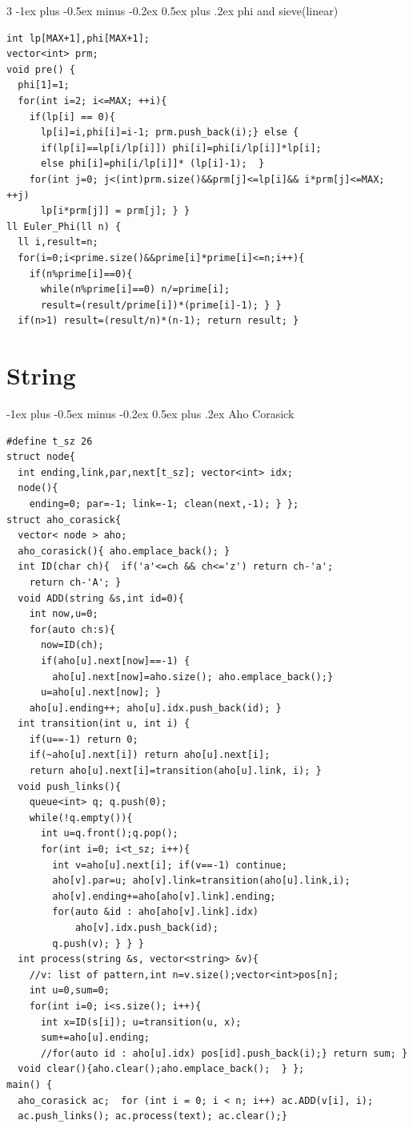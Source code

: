 \documentclass[8pt,a4paper,onesided]{article}
\makeatletter
\renewcommand{\subsection}{\@startsection{subsection}{2}{0mm}
    {-1ex plus -0.5ex minus -0.2ex} %
    {0.5ex plus .2ex}                %
    {\normalfont\large\bfseries}}    %
\makeatother
\begin{document}
\begin{multicols}{3}
\subsection{phi and sieve(linear)}
\begin{verbatim}
int lp[MAX+1],phi[MAX+1];
vector<int> prm;
void pre() {
  phi[1]=1;
  for(int i=2; i<=MAX; ++i){
    if(lp[i] == 0){
      lp[i]=i,phi[i]=i-1; prm.push_back(i);} else {
      if(lp[i]==lp[i/lp[i]]) phi[i]=phi[i/lp[i]]*lp[i];
      else phi[i]=phi[i/lp[i]]* (lp[i]-1);  }
    for(int j=0; j<(int)prm.size()&&prm[j]<=lp[i]&& i*prm[j]<=MAX; ++j) 
      lp[i*prm[j]] = prm[j]; } }
ll Euler_Phi(ll n) {
  ll i,result=n;
  for(i=0;i<prime.size()&&prime[i]*prime[i]<=n;i++){
    if(n%prime[i]==0){
      while(n%prime[i]==0) n/=prime[i];
      result=(result/prime[i])*(prime[i]-1); } }
  if(n>1) result=(result/n)*(n-1); return result; }
\end{verbatim}
\section{String}
\subsection{Aho Corasick}
\begin{verbatim}
#define t_sz 26
struct node{
  int ending,link,par,next[t_sz]; vector<int> idx;
  node(){
    ending=0; par=-1; link=-1; clean(next,-1); } };
struct aho_corasick{
  vector< node > aho;
  aho_corasick(){ aho.emplace_back(); }
  int ID(char ch){  if('a'<=ch && ch<='z') return ch-'a';
    return ch-'A'; }
  void ADD(string &s,int id=0){
    int now,u=0;
    for(auto ch:s){
      now=ID(ch);
      if(aho[u].next[now]==-1) {
        aho[u].next[now]=aho.size(); aho.emplace_back();}
      u=aho[u].next[now]; }
    aho[u].ending++; aho[u].idx.push_back(id); }
  int transition(int u, int i) {
    if(u==-1) return 0;
    if(~aho[u].next[i]) return aho[u].next[i];
    return aho[u].next[i]=transition(aho[u].link, i); }
  void push_links(){
    queue<int> q; q.push(0);
    while(!q.empty()){
      int u=q.front();q.pop();
      for(int i=0; i<t_sz; i++){
        int v=aho[u].next[i]; if(v==-1) continue;
        aho[v].par=u; aho[v].link=transition(aho[u].link,i);
        aho[v].ending+=aho[aho[v].link].ending;
        for(auto &id : aho[aho[v].link].idx)
            aho[v].idx.push_back(id);
        q.push(v); } } }
  int process(string &s, vector<string> &v){
    //v: list of pattern,int n=v.size();vector<int>pos[n];
    int u=0,sum=0;
    for(int i=0; i<s.size(); i++){
      int x=ID(s[i]); u=transition(u, x);
      sum+=aho[u].ending;
      //for(auto id : aho[u].idx) pos[id].push_back(i);} return sum; }
  void clear(){aho.clear();aho.emplace_back();  } };
main() {
  aho_corasick ac;  for (int i = 0; i < n; i++) ac.ADD(v[i], i);
  ac.push_links(); ac.process(text); ac.clear();}
\end{verbatim}

\end{multicols}
\end{document}
